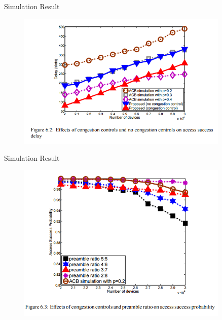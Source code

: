 \documentclass{beamer}
\begin{document}
\begin{frame}{Simulation Result}
    \begin{figure}[t]
        \centering
        \includegraphics[width=0.9\textwidth]{figures/6_2.png}
    \end{figure}
\end{frame}
\begin{frame}{Simulation Result}
    \begin{figure}[t]
        \centering
        \includegraphics[width=0.9\textwidth]{figures/6_3.png}
    \end{figure}
\end{frame}
\end{document}
